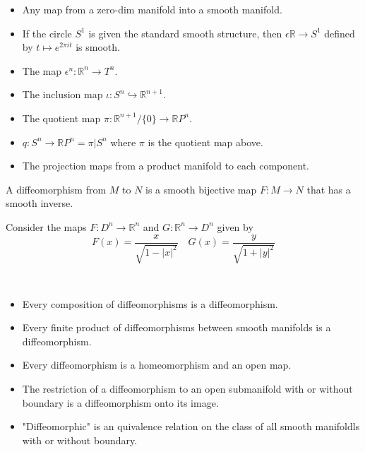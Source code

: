 \begin{example}\par
    \begin{itemize}
        \item Any map from a zero-dim manifold into a smooth manifold.\par
        \item If the circle $S^1$ is given the standard smooth structure, then $\epsilon \mathbb{R} \to S^1$ defined by $t\mapsto e^{2\pi i t}$ is smooth.
        \item The map $\epsilon^n:\mathbb{R}^n \to T^n$.
        \item The inclusion map $\iota: S^n \hookrightarrow \mathbb{R}^{n+1}$.
        \item The quotient map $\pi:\mathbb{R}^{n+1}/\{0\} \to \mathbb{R}P^n$.\par
        \item $q:S^n \to \mathbb{R}P^n = \pi|S^n$ where $\pi$ is the quotient map above.
        \item The projection maps from a product manifold to each component.
    \end{itemize}
\end{example}

\begin{definition}
    A diffeomorphism from $M$ to $N$ is a smooth bijective map $F:M\to N$ that has a smooth inverse.
\end{definition}

\begin{example}
Consider the maps $F:D^n \to \mathbb{R}^n$ and $G:\mathbb{R}^n \to D^n$ given by
\[
F(x) = \dfrac{x}{\sqrt{1-|x|^2}}\quad G(x) = \dfrac{y}{\sqrt{1+|y|^2}}
\]
\end{example}

\begin{proposition}\ \par
    \begin{itemize}
        \item Every composition of diffeomorphisms is a diffeomorphism.
        \item Every finite product of diffeomorphisms between smooth manifolds is a diffeomorphism.
        \item Every diffeomorphism is a homeomorphism and an open map.
        \item The restriction of a diffeomorphism to an open submanifold with or without boundary is a diffeomorphism onto its image.
        \item "Diffeomorphic" is an quivalence relation on the class of all smooth manifoldls with or without boundary.
    \end{itemize}
\end{proposition}

